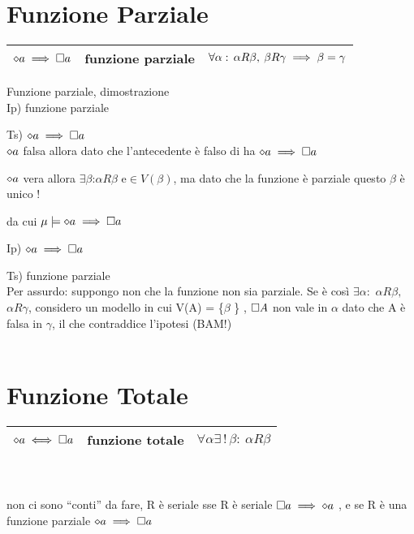 \section{Funzione Parziale}

\begin{tabular}{|c|c|c|}
\hline 
$\diamond a\implies\square a$  & funzione parziale  & $\forall\alpha:\,\alpha R\beta,\:\beta R\gamma\implies\beta=\gamma$\tabularnewline
\hline 
\end{tabular}

Funzione parziale, dimostrazione\\


Ip) funzione parziale

Ts) $\diamond a\implies\square a$ \\


$\diamond a$ falsa allora dato che l'antecedente è falso di ha $\diamond a\implies\square a$

$\diamond a$ vera allora $\exists\beta$:$\alpha R\beta$ e$\in V(\beta)$,
ma dato che la funzione è parziale questo $\beta$ è unico !

da cui $\mu\models\diamond a\implies\square a$

Ip) $\diamond a\implies\square a$ 

Ts) funzione parziale\\


Per assurdo: suppongo non che la funzione non sia parziale. Se è così
$\exists\alpha:$ $\alpha R\beta,$ $\alpha R\gamma$, considero un
modello in cui V(A) = \{$\beta$ \} , $\square A$ non vale in $\alpha$
dato che A è falsa in $\gamma$, il che contraddice l'ipotesi (BAM!)\\
 \\
 


\section{Funzione Totale}

\begin{tabular}{|c|c|c|}
\hline 
$\diamond a\iff\square a$  & funzione totale  & $\forall\alpha\exists\,!\,\beta:\:\alpha R\beta$ \tabularnewline
\hline 
\end{tabular}\\
 \\


non ci sono ``conti'' da fare, R è seriale sse R è seriale $\square a\implies\diamond a$
, e se R è una funzione parziale $\diamond a\implies\square a$

